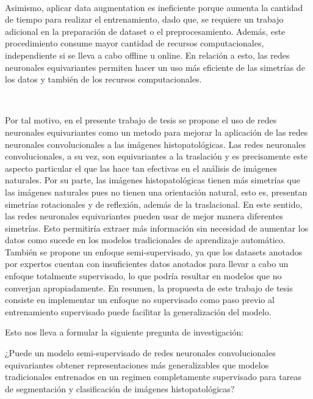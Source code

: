 \documentclass[12pt,letterpaper,final, openany]{scrbook}
\begin{document}
\\
\vspace{4mm}

Asimismo, aplicar data augmentation es ineficiente porque aumenta la cantidad de tiempo para realizar el entrenamiento, dado que, se requiere un trabajo adicional en la preparación de dataset o el preprocesamiento. Además, este procedimiento consume mayor cantidad de recursos computacionales, independiente si se lleva a cabo offline u online. En relación a esto, las redes neuronales equivariantes permiten hacer un uso más eficiente de las simetrías de los datos y también de los recursos computacionales.

\\
\vspace{4mm}

Por tal motivo, en el presente trabajo de tesis se propone el uso de redes neuronales equivariantes como un metodo para mejorar la aplicación de las redes neuronales convolucionales a las imágenes histopatológicas. Las redes neuronales convolucionales, a su vez, son equivariantes a la traslación y es precisamente este aspecto particular el que las hace tan efectivas en el análisis de imágenes naturales. Por su parte, las imágenes histopatológicas tienen más simetrías que las imágenes naturales pues no tienen una orientación natural, esto es, presentan simetrías rotacionales y de reflexión, además de la traslacional. En este sentido, las redes neuronales equivariantes pueden usar de mejor manera diferentes simetrías. Esto permitiría extraer más información sin necesidad de aumentar los datos como sucede en los modelos tradicionales de aprendizaje automático.
También se propone un enfoque semi-supervisado, ya que los datasets anotados por expertos cuentan con insuficientes datos anotados para llevar a cabo un enfoque totalmente supervisado, lo que podría resultar en modelos que no converjan apropiadamente. En resumen, la propuesta de este trabajo de tesis consiste en implementar un enfoque no supervisado como paso previo al entrenamiento supervisado puede facilitar la generalización del modelo.

Esto nos lleva a formular la siguiente pregunta de investigación:

¿Puede un modelo semi-supervisado de redes neuronales convolucionales equivariantes obtener representaciones más generalizables que modelos tradicionales entrenados en un regimen completamente supervisado para tareas de segmentación y clasificación de imágenes histopatológicas?
\end{document}
